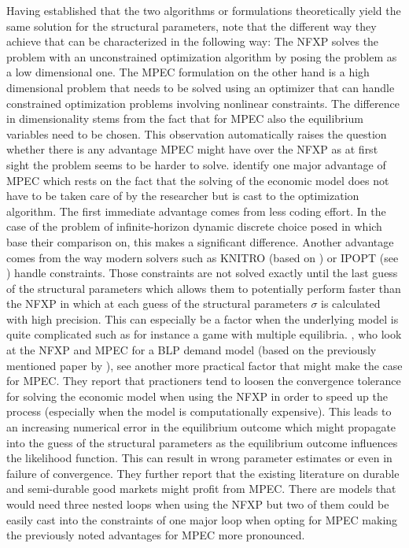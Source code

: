 Having established that the two algorithms or formulations theoretically yield the same solution for the structural parameters, \cite{Dong.Hsieh.Zhang.2017} note that the different way they achieve that can be characterized in the following way: The NFXP solves the problem with an unconstrained optimization algorithm by posing the problem as a low dimensional one. The MPEC formulation on the other hand is a high dimensional problem that needs to be solved using an optimizer that can handle constrained optimization problems involving nonlinear constraints. The difference in dimensionality stems from the fact that for MPEC also the equilibrium variables need to be chosen. This observation automatically raises the question whether there is any advantage MPEC might have over the NFXP as at first sight the problem seems to be harder to solve. \cite{Su.Judd.2012} identify one major advantage of MPEC which rests on the fact that the solving of the economic model does not have to be taken care of by the researcher but is cast to the optimization algorithm. The first immediate advantage comes from less coding effort. In the case of the problem of infinite-horizon dynamic discrete choice posed in \cite{Rust.1987} which \citeauthor{Su.Judd.2012} base their comparison on, this makes a significant difference. Another advantage comes from the way modern solvers such as KNITRO (based on \cite{Byrd.Nocedal.Waltz.2006}) or IPOPT (see \cite{Pirnay.Lopez-Negrete.Biegler.2011}) handle constraints. Those constraints are not solved exactly until the last guess of the structural parameters which allows them to potentially perform faster than the NFXP in which at each guess of the structural parameters $\sigma$ is calculated with high precision. This can especially be a factor when the underlying model is quite complicated such as for instance a game with multiple equilibria. \cite{Dube.Fox.Su.2012}, who look at the NFXP and MPEC for a BLP demand model (based on the previously mentioned paper by \cite{Berry.1995}), see another more practical factor that might make the case for MPEC. They report that practioners tend to loosen the convergence tolerance for solving the economic model when using the NFXP in order to speed up the process (especially when the model is computationally expensive). This leads to an increasing numerical error in the equilibrium outcome which might propagate into the guess of the structural parameters as the equilibrium outcome influences the likelihood function. This can result in wrong parameter estimates or even in failure of convergence. They further report that the existing literature on durable and semi-durable good markets might profit from MPEC. There are models that would need three nested loops when using the NFXP but two of them could be easily cast into the constraints of one major loop when opting for MPEC making the previously noted advantages for MPEC more pronounced.

